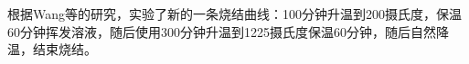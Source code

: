 根据Wang等\cite{wang2017}的研究，实验了新的一条烧结曲线：100分钟升温到200摄氏度，保温60分钟挥发溶液，随后使用300分钟升温到1225摄氏度保温60分钟，随后自然降温，结束烧结。